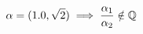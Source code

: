 \documentclass[preview]{standalone}
\begin{document}
\begin{align*}
\special{dvisvgm:raw <g id='unique000'>}\alpha = (1.0, \sqrt{2}) \implies \frac{\alpha_1}{\alpha_2} \notin \mathbb{Q}\special{dvisvgm:raw </g>}
\end{align*}
\end{document}
